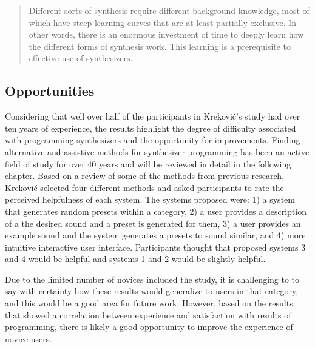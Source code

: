 \begin{quote}
    Different sorts of synthesis require different background knowledge, most of which have steep learning curves that are at least partially exclusive. In other words, there is an enormous investment of time to deeply learn how the different forms of synthesis work. This learning is a prerequisite to effective use of synthesizers.
\end{quote}

\subsection{Opportunities}
Considering that well over half of the participants in Krekovi\'{c}'s study had over ten years of experience, the results highlight the degree of difficulty associated with programming synthesizers and the opportunity for improvements. Finding alternative and assistive methods for synthesizer programming has been an active field of study for over 40 years and will be reviewed in detail in the following chapter. Based on a review of some of the methods from previous research, Krekovi\'{c} selected four different methods and asked participants to rate the perceived helpfulness of each system. The systems proposed were: 1) a system that generates random presets within a category, 2) a user provides a description of a the desired sound and a preset is generated for them, 3) a user provides an example sound and the system generates a presets to sound similar, and 4) more intuitive interactive user interface. Participants thought that proposed systems 3 and 4 would be helpful and systems 1 and 2 would be slightly helpful. 

Due to the limited number of novices included the study, it is challenging to to say with certainty how these results would generalize to users in that category, and this would be a good area for future work. However, based on the results that showed a correlation between experience and satisfaction with results of programming, there is likely a good opportunity to improve the experience of novice users.

